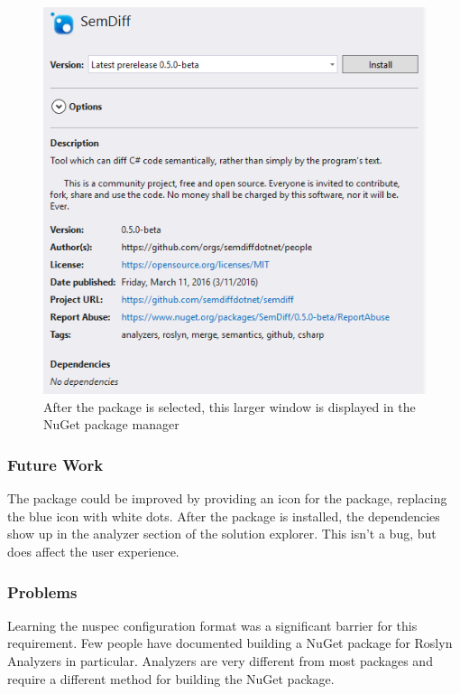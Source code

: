 \documentclass[draftclsnofoot,onecolumn]{IEEEtran}
\begin{document}
\begin{figure}[!t]
\centering
\includegraphics[width=\textwidth]{SemDiffInPackageManager}

\caption{After the package is selected, this larger window is displayed in 
the NuGet package manager}
\label{pacman}
\end{figure}

\subsubsection{Future Work}

The package could be improved by providing an icon for the package, 
replacing the blue icon with white dots. After the package is installed, the 
dependencies show up in the analyzer section of the solution explorer. This 
isn’t a bug, but does affect the user experience.

\subsubsection{Problems}

Learning the nuspec configuration format was a significant barrier for this 
requirement. Few people have documented building a NuGet package for Roslyn 
Analyzers in particular. Analyzers are very different from most packages and 
require a different method for building the NuGet package. 
\end{document}
